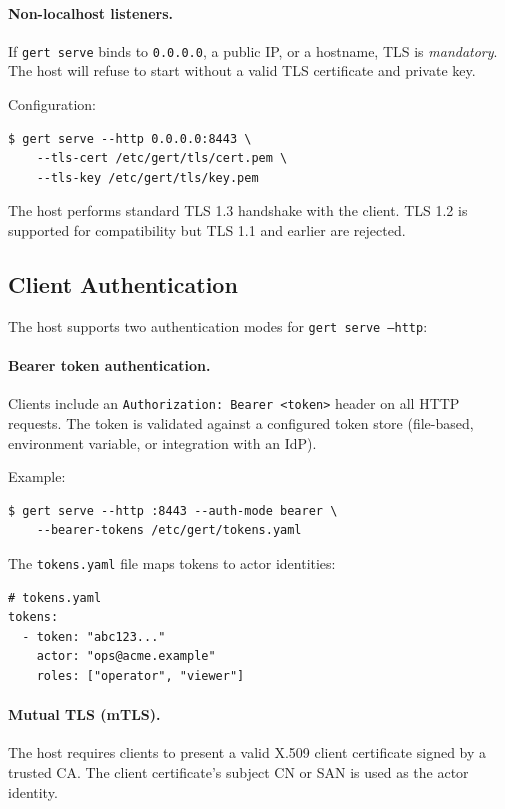 \paragraph{Non-localhost listeners.}
If \texttt{gert serve} binds to \texttt{0.0.0.0}, a public IP, or a hostname,
TLS is \emph{mandatory}.  The host will refuse to start without a valid TLS
certificate and private key.

Configuration:

\begin{verbatim}
$ gert serve --http 0.0.0.0:8443 \
    --tls-cert /etc/gert/tls/cert.pem \
    --tls-key /etc/gert/tls/key.pem
\end{verbatim}

The host performs standard TLS 1.3 handshake with the client.  TLS 1.2 is
supported for compatibility but TLS 1.1 and earlier are rejected.

\subsection{Client Authentication}

The host supports two authentication modes for \texttt{gert serve --http}:

\paragraph{Bearer token authentication.}
Clients include an \texttt{Authorization: Bearer <token>} header on all HTTP
requests.  The token is validated against a configured token store
(file-based, environment variable, or integration with an IdP).

Example:

\begin{verbatim}
$ gert serve --http :8443 --auth-mode bearer \
    --bearer-tokens /etc/gert/tokens.yaml
\end{verbatim}

The \texttt{tokens.yaml} file maps tokens to actor identities:

\begin{verbatim}
# tokens.yaml
tokens:
  - token: "abc123..."
    actor: "ops@acme.example"
    roles: ["operator", "viewer"]
\end{verbatim}

\paragraph{Mutual TLS (mTLS).}
The host requires clients to present a valid X.509 client certificate signed by
a trusted CA.  The client certificate's subject CN or SAN is used as the actor
identity.

